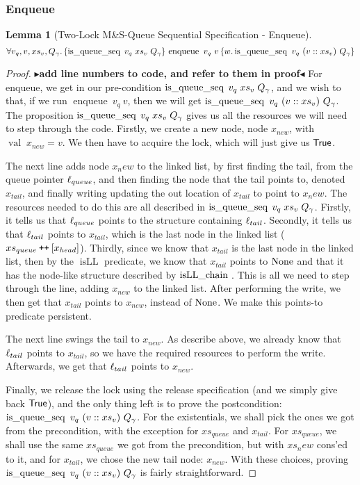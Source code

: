 \documentclass[a4paper, 11pt]{report}
\newtheorem{lemma}[theorem]{Lemma}
\newcommand{\enqueue}{\operatorname{enqueue}}
\newcommand{\tlmsq}{Two-Lock M\&S-Queue\xspace}
\newcommand{\isqueueseq}{\operatorname{is\_queue\_seq}}
\newcommand{\isLLchain}[1]{\operatorname{isLL\_chain} \; #1}
\newcommand{\isLL}{\operatorname{isLL}}
\newcommand{\nVal}[1]{\operatorname{val} \; #1}
\newcommand\catenate{\mathbin{\text{\ttfamily\upshape ++}}}
\newcommand{\tlseqspecenq}{\All v_q, v, xs_v, Q_\gname. \hoare{\isqueueseq \; v_q \; xs_v \; Q_\gname}{\enqueue\ v_q\ v}{w . \isqueueseq\ v_q\ (v :: xs_v)\ Q_\gname}}
\newcommand{\todo}[1]{{\color[rgb]{.5,0,0}\textbf{$\blacktriangleright$#1$\blacktriangleleft$}}}
\begin{document}
\subsubsection{Enqueue}
\begin{lemma}[\tlmsq Sequential Specification - Enqueue]\label{TLMSQ:spec:seq:enqueue}
  \begin{equation*}
    \tlseqspecenq
  \end{equation*}
\end{lemma}
\begin{proof}
\todo{add line numbers to code, and refer to them in proof}
For enqueue, we get in our pre-condition $\isqueueseq \; v_q \; xs_v \; Q_\gname$, and we wish to that, if we run $\enqueue\ v_q\ v$, then we will get $\isqueueseq\ v_q\ (v :: xs_v)\ Q_\gname$. The proposition $\isqueueseq \; v_q \; xs_v \; Q_\gname$ gives us all the resources we will need to step through the code.
Firstly, we create a new node, node $x_{new}$, with $\nVal{x_{new}} = v$.
We then have to acquire the lock, which will just give us $\textsf{True}$.

The next line adds node $x_new$ to the linked list, by first finding the tail, from the queue pointer $\ell_{queue}$, and then finding the node that the tail points to, denoted $x_{tail}$, and finally writing updating the out location of $x_{tail}$ to point to $x_new$. The resources needed to do this are all described in $\isqueueseq \; v_q \; xs_v \; Q_\gname$. Firstly, it tells us that $\ell_{queue}$ points to the structure containing $\ell_{tail}$. Secondly, it tells us that $\ell_{tail}$ points to $x_{tail}$, which is the last node in the linked list ($xs_{queue} \catenate [x_{head}]$). Thirdly, since we know that $x_{tail}$ is the last node in the linked list, then by the $\isLL$ predicate, we know that $x_{tail}$ points to $\operatorname{None}$ and that it has the node-like structure described by $\isLLchain$. This is all we need to step through the line, adding $x_{new}$ to the linked list. After performing the write, we then get that $x_{tail}$ points to $x_{new}$, instead of $\operatorname{None}$. We make this points-to predicate persistent.

The next line swings the tail to $x_{new}$. As describe above, we already know that $\ell_{tail}$ points to $x_{tail}$, so we have the required resources to perform the write. Afterwards, we get that $\ell_{tail}$ points to $x_{new}$.

Finally, we release the lock using the release specification (and we simply give back $\textsf{True}$), and the only thing left is to prove the postcondition: $\isqueueseq\ v_q\ (v :: xs_v)\ Q_\gname$. For the existentials, we shall pick the ones we got from the precondition, with the exception for $xs_{queue}$ and $x_{tail}$. For $xs_{queue}$, we shall use the same $xs_{queue}$ we got from the precondition, but with $xs_new$ cons'ed to it, and for $x_{tail}$, we chose the new tail node: $x_{new}$. With these choices, proving $\isqueueseq\ v_q\ (v :: xs_v)\ Q_\gname$ is fairly straightforward.
\end{proof}
\end{document}
